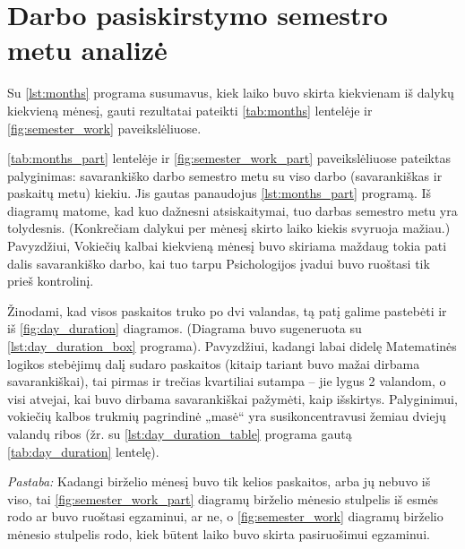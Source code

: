 \section{Darbo pasiskirstymo semestro metu analizė}

Su \ref{lst:months} programa susumavus, kiek laiko buvo skirta kiekvienam
iš dalykų kiekvieną mėnesį, gauti rezultatai pateikti
\ref{tab:months} lentelėje ir \ref{fig:semester_work} paveikslėliuose.

\ref{tab:months_part} lentelėje ir \ref{fig:semester_work_part}
paveikslėliuose pateiktas palyginimas: savarankiško darbo semestro
metu su viso darbo (savarankiškas ir paskaitų metu) kiekiu. Jis
gautas panaudojus \ref{lst:months_part} programą. Iš diagramų matome,
kad kuo dažnesni atsiskaitymai, tuo darbas semestro metu yra tolydesnis.
(Konkrečiam dalykui per mėnesį skirto laiko kiekis svyruoja mažiau.)
Pavyzdžiui, Vokiečių kalbai kiekvieną mėnesį buvo skiriama maždaug
tokia pati dalis savarankiško darbo, kai tuo tarpu Psichologijos
įvadui buvo ruoštasi tik prieš kontrolinį.

Žinodami, kad visos paskaitos truko po dvi valandas, tą patį galime
pastebėti ir iš \ref{fig:day_duration} diagramos. (Diagrama buvo
sugeneruota su \ref{lst:day_duration_box} programa). Pavyzdžiui,
kadangi labai didelę Matematinės logikos stebėjimų dalį sudaro paskaitos
(kitaip tariant buvo mažai dirbama savarankiškai), tai pirmas ir trečias 
kvartiliai sutampa – jie lygus 2 valandom, o visi atvejai, kai buvo
dirbama savarankiškai pažymėti, kaip išskirtys. Palyginimui, vokiečių
kalbos trukmių pagrindinė „masė“ yra susikoncentravusi žemiau
dviejų valandų ribos (žr. su \ref{lst:day_duration_table} programa
gautą \ref{tab:day_duration} lentelę).

\emph{Pastaba:} Kadangi birželio mėnesį buvo tik kelios paskaitos, arba
jų nebuvo iš viso, tai \ref{fig:semester_work_part} diagramų birželio
mėnesio stulpelis iš esmės rodo ar buvo ruoštasi egzaminui, ar ne, o
\ref{fig:semester_work} diagramų birželio mėnesio stulpelis rodo, kiek 
būtent laiko buvo skirta pasiruošimui egzaminui.


